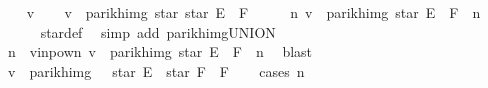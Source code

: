 \begin{isabellebody}
%
\isadelimproof
%
\endisadelimproof
%
\isatagproof
{}\isamarkupfalse%
\isanewline
\ \ \isamarkupfalse%
\ v\isanewline
\ \ \isamarkupfalse%
\ {\isachardoublequoteopen}v\ {\isasymin}\ parikh{\isacharunderscore}{\kern0pt}img\ {\isacharparenleft}{\kern0pt}star\ {\isacharparenleft}{\kern0pt}star\ E\ {\isacharat}{\kern0pt}{\isacharat}{\kern0pt}\ F{\isacharparenright}{\kern0pt}{\isacharparenright}{\kern0pt}{\isachardoublequoteclose}\isanewline
\ \ \isamarkupfalse%
\ \isamarkupfalse%
\ {\isachardoublequoteopen}{\isasymexists}n{\isachardot}{\kern0pt}\ v\ {\isasymin}\ parikh{\isacharunderscore}{\kern0pt}img\ {\isacharparenleft}{\kern0pt}{\isacharparenleft}{\kern0pt}star\ E\ {\isacharat}{\kern0pt}{\isacharat}{\kern0pt}\ F{\isacharparenright}{\kern0pt}\ {\isacharcircum}{\kern0pt}{\isacharcircum}{\kern0pt}\ n{\isacharparenright}{\kern0pt}{\isachardoublequoteclose}\isanewline
\ \ \ \ \isamarkupfalse%
\ star{\isacharunderscore}{\kern0pt}def\ \isamarkupfalse%
\ {\isacharparenleft}{\kern0pt}simp\ add{\isacharcolon}{\kern0pt}\ parikh{\isacharunderscore}{\kern0pt}img{\isacharunderscore}{\kern0pt}UNION{\isacharparenright}{\kern0pt}\isanewline
\ \ \isamarkupfalse%
\ \isamarkupfalse%
\ n\ \ v{\isacharunderscore}{\kern0pt}in{\isacharunderscore}{\kern0pt}pow{\isacharunderscore}{\kern0pt}n{\isacharcolon}{\kern0pt}\ {\isachardoublequoteopen}v\ {\isasymin}\ parikh{\isacharunderscore}{\kern0pt}img\ {\isacharparenleft}{\kern0pt}{\isacharparenleft}{\kern0pt}star\ E\ {\isacharat}{\kern0pt}{\isacharat}{\kern0pt}\ F{\isacharparenright}{\kern0pt}\ {\isacharcircum}{\kern0pt}{\isacharcircum}{\kern0pt}\ n{\isacharparenright}{\kern0pt}{\isachardoublequoteclose}\ \isamarkupfalse%
\ blast\isanewline
\ \ \isamarkupfalse%
\ {\isachardoublequoteopen}v\ {\isasymin}\ parikh{\isacharunderscore}{\kern0pt}img\ {\isacharparenleft}{\kern0pt}{\isacharbraceleft}{\kern0pt}{\isacharbrackleft}{\kern0pt}{\isacharbrackright}{\kern0pt}{\isacharbraceright}{\kern0pt}\ {\isasymunion}\ star\ E\ {\isacharat}{\kern0pt}{\isacharat}{\kern0pt}\ star\ F\ {\isacharat}{\kern0pt}{\isacharat}{\kern0pt}\ F{\isacharparenright}{\kern0pt}{\isachardoublequoteclose}\isanewline
\ \ \isamarkupfalse%
\ {\isacharparenleft}{\kern0pt}cases\ n{\isacharparenright}{\kern0pt}\isanewline
\ \ \ \ \isamarkupfalse%
\ {}\isanewline
\ \ \ \ \isamarkupfalse%

\end{isabellebody}
